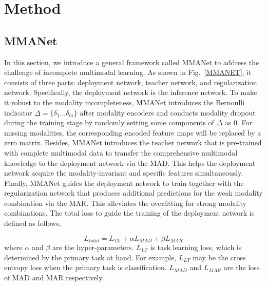 \documentclass[10pt,twocolumn,letterpaper]{article}
\begin{document}
\section{Method}

\subsection{MMANet}

In this section, we introduce a general framework called MMANet to address the challenge of incomplete multimodal learning. As shown in Fig.~\ref{MMANET}, it consists of three parts: deployment network, teacher network, and regularization network. Specifically, the deployment network is the inference network. To make it robust to the modality incompleteness, MMANet introduces the Bernoulli indicator $\Delta=\{\delta_{1}...\delta_{m}\}$ after modality encoders and conducts modality dropout during the training stage by randomly setting some components of $\Delta$ as 0. For missing modalities, the corresponding encoded feature maps will be replaced by a zero matrix. Besides, MMANet introduces the teacher network that is pre-trained with complete multimodal data to transfer the comprehensive multimodal knowledge to the deployment network via the MAD. This helps the deployment network acquire the modality-invariant and specific features simultaneously. Finally, MMANet guides the deployment network to train together with the regularization network that produces additional predictions for the weak modality combination via the MAR. This alleviates the overfitting for strong modality combinations. The total loss to guide the training of the deployment network is defined as follows,



\begin{equation}
  L_{total}=L_{TL}+ \alpha L_{MAD}+\beta L_{MAR}
\end{equation} where $\alpha$ and $\beta$ are the hyper-parameters. $L_{LT}$ is task learning loss, which is determined by the primary task at hand. For example, $L_{LT}$ may be the cross entropy loss when the primary task is classification. $L_{MAD}$ and $L_{MAR}$ are the loss of MAD and MAR respectively. 
\end{document}
